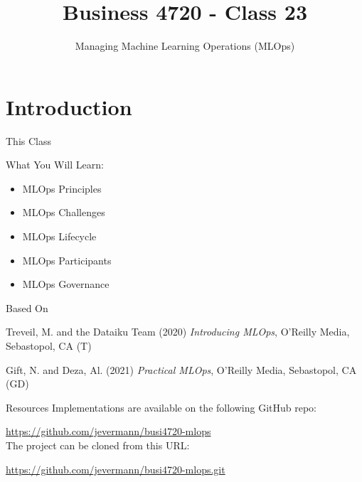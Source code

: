 \documentclass[ignorenonframetext,xcolor=x11names]{beamer}
\title{Business 4720 - Class 23}
\subtitle{Managing Machine Learning Operations (MLOps)}
\begin{document}
\begin{frame}{}
  \titlepage
  \footnotesize
  
\end{frame}

\section{Introduction}

\begin{frame}{This Class}

\begin{block}{What You Will Learn:}
\begin{itemize}
  \item MLOps Principles
  \item MLOps Challenges
  \item MLOps Lifecycle
  \item MLOps Participants
  \item MLOps Governance
\end{itemize}
\end{block}
\end{frame}

\begin{frame}{Based On}
\begin{block}{}
Treveil, M. and the Dataiku Team (2020) \emph{Introducing MLOps}, O'Reilly Media, Sebastopol, CA (T) \\
\end{block}

\begin{block}{}
Gift, N. and Deza, Al. (2021) \emph{Practical MLOps}, O'Reilly Media, Sebastopol, CA (GD) \\
\end{block}
\end{frame}

\begin{frame}{Resources}
Implementations are available on the following GitHub repo:

\small\url{https://github.com/jevermann/busi4720-mlops}\normalsize \\


The project can be cloned from this URL:

\small\url{https://github.com/jevermann/busi4720-mlops.git}\normalsize
\end{frame}
\end{document}
